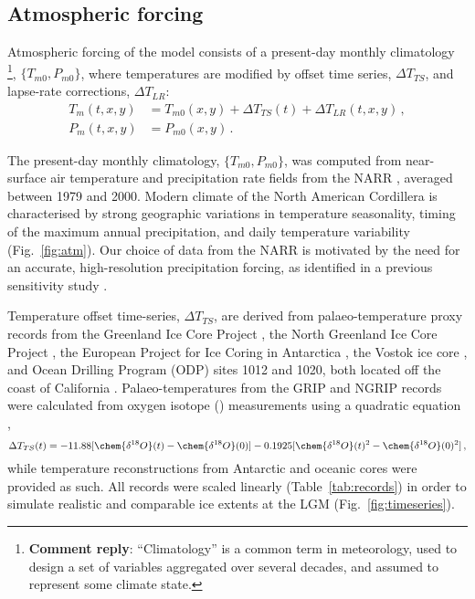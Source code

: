\documentclass[tc, manuscript]{copernicus}
\newcommand{\renote}[1]{\footnote{\textbf{Comment reply}: #1}}
\begin{document}
\subsection{Atmospheric forcing}
\label{sec:atm}

Atmospheric forcing of the model consists of a present-day monthly climatology%
\renote{
    ``Climatology'' is a common term in meteorology, used to design a set
    of variables aggregated over several decades, and assumed to represent
    some climate state.},
$\{T_{m0}, P_{m0}\}$, where temperatures are modified by offset time series,
${\Delta}T_{TS}$, and lapse-rate corrections, ${\Delta}T_{LR}$:
\begin{align}
    T_m(t, x, y) &= T_{m0}(x, y) + {\Delta}T_{TS}(t)
                    + {\Delta}T_{LR}(t, x, y) \,, \\
    P_m(t, x, y) &= P_{m0}(x, y) \,.
\end{align}

The present-day monthly climatology, $\{T_{m0}, P_{m0}\}$, was computed from
near-surface air temperature and precipitation rate fields from the NARR
\citep{Mesinger.etal.2006}, averaged between 1979 and 2000. Modern climate of the
North American Cordillera is characterised by strong geographic variations in
temperature seasonality, timing of the maximum annual precipitation, and
daily temperature variability (Fig.~\ref{fig:atm}).
Our choice of data from the NARR is motivated by the need for an accurate,
high-resolution precipitation forcing, as identified in a previous sensitivity
study \citep{Seguinot.etal.2014}.

Temperature offset time-series, ${\Delta}T_{TS}$, are derived from
palaeo-temperature proxy records from
the Greenland Ice Core Project \citep[GRIP,][]{Dansgaard.etal.1993}, the
North Greenland Ice Core Project \citep[NGRIP,][]{Andersen.etal.2004},
the European Project for Ice Coring in Antarctica \citep[EPICA,][]
{Jouzel.etal.2007}, the Vostok ice core \citep{Petit.etal.1999}, and Ocean
Drilling Program (ODP) sites 1012 and 1020, both located off the coast of
California \citep{Herbert.etal.2001}. Palaeo-temperatures from the GRIP and
NGRIP
records were calculated from oxygen isotope () measurements
using a quadratic equation \citep{Johnsen.etal.1995},
\begin{equation}
    {\Delta}T_{TS}(t) = -11.88 [\chem{\delta^{18}O}(t)
                               -\chem{\delta^{18}O}(0)]
                        -0.1925[\chem{\delta^{18}O}(t)^2
                                -\chem{\delta^{18}O}(0)^2] \,,
\end{equation}
while temperature reconstructions from Antarctic and oceanic cores were
provided as such. All records were scaled linearly (Table~\ref{tab:records}) in
order to simulate realistic and comparable ice extents at the LGM
(Fig.~\ref{fig:timeseries}).
\end{document}

